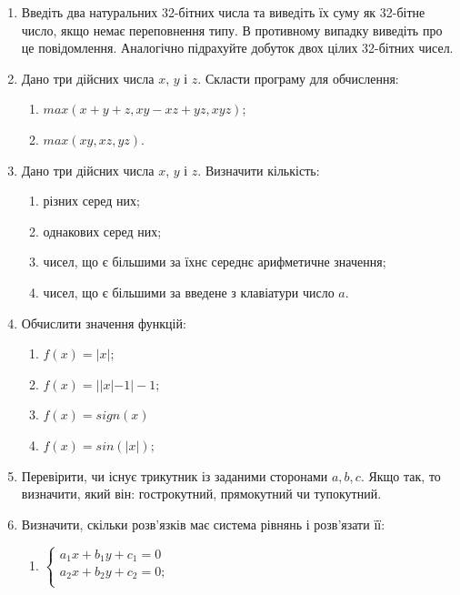 \documentclass[]{article}
\makeatletter
\newcommand{\xslalph}[1]{\expandafter\@xslalph\csname c@#1\endcsname}
\newcommand{\@xslalph}[1]{%
    \ifcase#1\or а\or б\or в\or г\or д\or e\or є\or ж\or з\or i%
    \or й\or к\or л\or м\or н\or о\or п\or р\or с\or т%
    \or у\or ф\or х\or ц\or ч\or ш\or ю\or я\or аа\or бб\or вв%
    \else\@ctrerr\fi%
}
\makeatother
\begin{document}
\begin{enumerate}
\def\labelenumi{\arabic{enumi})}
\setcounter{enumi}{7}
\item
  Введіть два натуральних 32-бітних числа та виведіть їх суму як
  32-бітне число, якщо немає переповнення типу. В противному випадку
  виведіть про це повідомлення. Аналогічно підрахуйте добуток двох цілих
  32-бітних чисел.
\item
  Дано три дійсних числа $x$, $y$ і $z$. Скласти програму для
  обчислення:
\begin{enumerate}[label=\xslalph*)]
\item
  \(max(x + y + z,xy- xz + yz,xyz)\);
\item
  \(max(xy,xz,yz)\).
\end{enumerate}

\item
  Дано три дійсних числа $x$, $y$ і $z$. Визначити кількість:
\begin{enumerate}[label=\xslalph*)]
\item різних серед них; 
\item однакових серед них;
\item чисел, що є більшими за їхнє середнє арифметичне значення;
\item чисел, що є більшими за введене з клавіатури число \(a\).
\end{enumerate}

\item
  Обчислити значення функцій:
\begin{enumerate}[label=\xslalph*)]
\item \(f(x) = |x|;\) \item \(f(x) = ||x| - 1| - 1;\)
\item \(f(x) = sign(x)\) \item \(f(x) = sin(|x|);\)

\end{enumerate}


\item
  Перевірити, чи існує трикутник із заданими сторонами $a,b,c$.
  Якщо так, то визначити, який він: гострокутний, прямокутний чи
  тупокутний.

\item
  Визначити, скільки розв'язків має система рівнянь і розв'язати її:
\begin{enumerate}[label=\xslalph*)]
\item \(\left\{ \begin{matrix}
a_{1}x + b_{1}y + c_{1} = 0 \\
a_{2}x + b_{2}y + c_{2} = 0; \\
\end{matrix} \right.\ \) 


\end{enumerate}
\end{enumerate}
\end{document}
